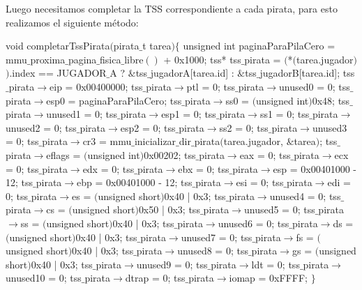 Luego necesitamos completar la TSS correspondiente a cada pirata, para esto realizamos el siguiente m\'etodo:

\begin{algorithmic}
\State \tab void completarTssPirata$($pirata$\_$t tarea$) \{$
  \State \tab \tab unsigned int paginaParaPilaCero = mmu$\_$proxima$\_$pagina$\_$fisica$\_$libre$()$ + 0x1000;
\State \tab \tab
  \State \tab \tab tss* tss$\_$pirata = $($*$($tarea.jugador$)$$)$.index == JUGADOR$\_$A ? $\&$tss$\_$jugadorA[tarea.id] : $\&$tss$\_$jugadorB[tarea.id];
\State \tab \tab
  \State \tab \tab tss$\_$pirata$\to$eip = 0x00400000;
  \State \tab \tab tss$\_$pirata$\to$ptl = 0;
  \State \tab \tab tss$\_$pirata$\to$unused0 = 0;
  \State \tab \tab tss$\_$pirata$\to$esp0 = paginaParaPilaCero;
  \State \tab \tab tss$\_$pirata$\to$ss0 = $($unsigned int$)$0x48;
  \State \tab \tab tss$\_$pirata$\to$unused1 = 0;
  \State \tab \tab tss$\_$pirata$\to$esp1 = 0;
  \State \tab \tab tss$\_$pirata$\to$ss1 = 0;
  \State \tab \tab tss$\_$pirata$\to$unused2 = 0;
  \State \tab \tab tss$\_$pirata$\to$esp2 = 0;
  \State \tab \tab tss$\_$pirata$\to$ss2 = 0;
  \State \tab \tab tss$\_$pirata$\to$unused3 = 0;
  \State \tab \tab tss$\_$pirata$\to$cr3 = mmu$\_$inicializar$\_$dir$\_$pirata$($tarea.jugador, $\&$tarea$)$;
  \State \tab \tab tss$\_$pirata$\to$eflags = $($unsigned int$)$0x00202;
  \State \tab \tab tss$\_$pirata$\to$eax = 0;
  \State \tab \tab tss$\_$pirata$\to$ecx = 0;
  \State \tab \tab tss$\_$pirata$\to$edx = 0;
  \State \tab \tab tss$\_$pirata$\to$ebx = 0;
  \State \tab \tab tss$\_$pirata$\to$esp = 0x00401000 - 12;
  \State \tab \tab tss$\_$pirata$\to$ebp = 0x00401000 - 12;
  \State \tab \tab tss$\_$pirata$\to$esi = 0;
  \State \tab \tab tss$\_$pirata$\to$edi = 0;
  \State \tab \tab tss$\_$pirata$\to$es = $($unsigned short$)$0x40 | 0x3;
  \State \tab \tab tss$\_$pirata$\to$unused4 = 0;
  \State \tab \tab tss$\_$pirata$\to$cs = $($unsigned short$)$0x50 | 0x3;
  \State \tab \tab tss$\_$pirata$\to$unused5 = 0;
  \State \tab \tab tss$\_$pirata$\to$ss = $($unsigned short$)$0x40 | 0x3;
  \State \tab \tab tss$\_$pirata$\to$unused6 = 0;
  \State \tab \tab tss$\_$pirata$\to$ds = $($unsigned short$)$0x40 | 0x3;
  \State \tab \tab tss$\_$pirata$\to$unused7 = 0;
  \State \tab \tab tss$\_$pirata$\to$fs = $($unsigned short$)$0x40 | 0x3;
  \State \tab \tab tss$\_$pirata$\to$unused8 = 0;
  \State \tab \tab tss$\_$pirata$\to$gs = $($unsigned short$)$0x40 | 0x3;
  \State \tab \tab tss$\_$pirata$\to$unused9 = 0;
  \State \tab \tab tss$\_$pirata$\to$ldt = 0;
  \State \tab \tab tss$\_$pirata$\to$unused10 = 0;
  \State \tab \tab tss$\_$pirata$\to$dtrap = 0;
  \State \tab \tab tss$\_$pirata$\to$iomap = 0xFFFF;
\State \tab $\}$
\end{algorithmic}

